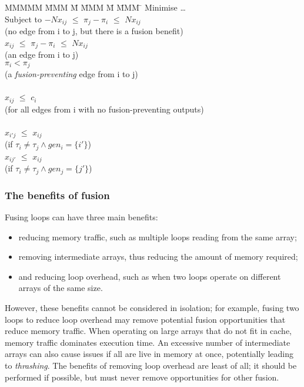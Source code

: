 \begin{tabbing}
MMMMM   \= MMM \= M \= MMM \= M \= MMM \= \kill
Minimise   \> \ldots \\
Subject to \> $-N x_{ij}$ \> $\le$ \> $\pi_j - \pi_i$ \> $\le$ \> $N x_{ij}$ \\
           \>             (no edge from i to j, but there is a fusion benefit)            \\
           \>    $x_{ij}$ \> $\le$ \> $\pi_j - \pi_i$ \> $\le$ \> $N x_{ij}$ \\
           \>             (an edge from i to j)            \\
           \>             \>       \> $\pi_i < \pi_j$ \>       \>            \\
           \>             (a \emph{fusion-preventing} edge from i to j)            \\
\\
           \> $x_{ij}$    \> $\le$ \> $c_i$           \>       \>            \\
           \> (for all edges from i with no fusion-preventing outputs)      \\
\\
           \> $x_{i'j}$   \> $\le$ \> $x_{ij}$        \>       \>            \\
           \> (if $\tau_i \not= \tau_j \wedge gen_i=\{i'\}$) \\
           \> $x_{ij'}$   \> $\le$ \> $x_{ij}$        \>       \>            \\
           \> (if $\tau_i \not= \tau_j \wedge gen_j=\{j'\}$) \\
\end{tabbing}


\subsubsection{The benefits of fusion}

Fusing loops can have three main benefits:
\begin{itemize}
\item
reducing memory traffic, such as multiple loops reading from the same array;
\item
removing intermediate arrays, thus reducing the amount of memory required;
\item
and reducing loop overhead, such as when two loops operate on different arrays of the same size.
\end{itemize}
However, these benefits cannot be considered in isolation; for example, fusing two loops to reduce loop overhead may remove potential fusion opportunities that reduce memory traffic.
When operating on large arrays that do not fit in cache, memory traffic dominates execution time.
An excessive number of intermediate arrays can also cause issues if all are live in memory at once, potentially leading to \emph{thrashing}.
The benefits of removing loop overhead are least of all; it should be performed if possible, but must never remove opportunities for other fusion.

